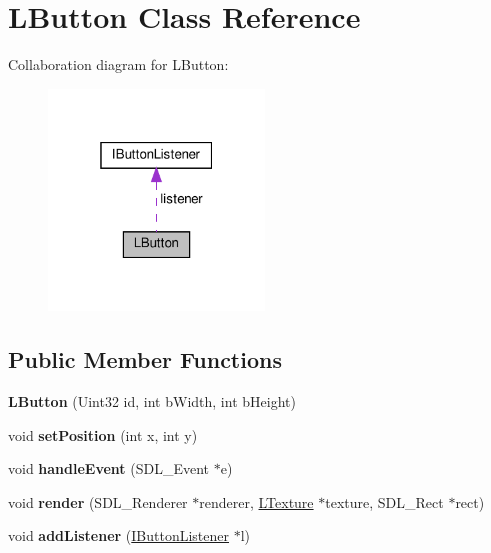 \hypertarget{classLButton}{}\section{L\+Button Class Reference}
\label{classLButton}


Collaboration diagram for L\+Button\+:
\nopagebreak
\begin{figure}[H]
\begin{center}
\leavevmode
\includegraphics[width=163pt]{classLButton__coll__graph}
\end{center}
\end{figure}
\subsection*{Public Member Functions}
\begin{DoxyCompactItemize}
\item 
\mbox{\label{classLButton_accefecf724cb9d6820d04d5c1d92002a}} 
{\bfseries L\+Button} (Uint32 id, int b\+Width, int b\+Height)
\item 
\mbox{\label{classLButton_adf374214d3d7b52d59072431917fb7da}} 
void {\bfseries set\+Position} (int x, int y)
\item 
\mbox{\label{classLButton_a6dd54388797d4059315988878d376d55}} 
void {\bfseries handle\+Event} (S\+D\+L\+\_\+\+Event $\ast$e)
\item 
\mbox{\label{classLButton_a9fdb93842f08762ef0607731992cbefb}} 
void {\bfseries render} (S\+D\+L\+\_\+\+Renderer $\ast$renderer, \hyperlink{classLTexture}{L\+Texture} $\ast$texture, S\+D\+L\+\_\+\+Rect $\ast$rect)
\item 
\mbox{\label{classLButton_aab2bb67ade040cc4609b1de7c4545b89}} 
void {\bfseries add\+Listener} (\hyperlink{classIButtonListener}{I\+Button\+Listener} $\ast$l)
\end{DoxyCompactItemize}
